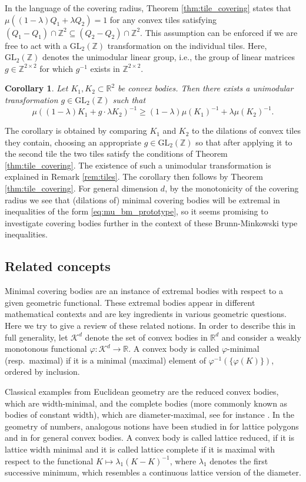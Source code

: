 \documentclass[11pt, a4paper]{amsart}
\newcommand{\RR}{\mathbb{R}}
\newcommand{\ZZ}{\mathbb{Z}}
\newcommand{\K}{\mathcal{K}}
\newcommand{\GL}{\mathrm{GL}}
\numberwithin{equation}{section}
\theoremstyle{plain}
\newtheorem{corollary}[theorem]{Corollary}
\begin{document}
In the language of the covering radius, Theorem \ref{thm:tile_covering} states that $\mu((1-\lambda)Q_1 + \lambda Q_2)=1$ for any convex tiles satisfying $(Q_1-Q_1)\cap\ZZ^2 \subseteq (Q_2-Q_2) \cap \ZZ^2$. This assumption can be enforced if we are free to act with a $\GL_2(\ZZ)$ transformation on the individual tiles. Here, $\GL_2(\ZZ)$ denotes the unimodular linear group, i.e., the group of linear matrices $g\in\ZZ^{2\times 2}$ for which $g^{-1}$ exists in $\ZZ^{2\times 2}$.

\begin{corollary}
\label{cor:isomorphic_mu_bm}
Let $K_1,K_2\subset\RR^2$ be convex bodies. Then there exists a unimodular transformation $g\in \GL_2(\ZZ)$ such that
\[
\mu((1-\lambda)K_1 + g\cdot\lambda K_2)^{-1} \geq (1-\lambda)\mu(K_1)^{-1} + \lambda\mu(K_2)^{-1}.
\]
\end{corollary}

The corollary is obtained by comparing $K_1$ and $K_2$ to the dilations of convex tiles they contain, choosing  an appropriate $g\in \GL_2(\ZZ)$ so that after applying it to the second tile the two tiles satisfy the conditions of Theorem \ref{thm:tile_covering}. The existence of such a unimodular transformation is explained in Remark \ref{rem:tiles}. The corollary then follows by Theorem \ref{thm:tile_covering}. For general dimension $d$, by the monotonicity of the covering radius we see that (dilations of) minimal covering bodies will be extremal in inequalities of the form \eqref{eq:mu_bm_prototype}, so it seems promising to investigate covering bodies further in the context of these Brunn-Minkowski type inequalities.


\subsection*{Related concepts}

Minimal covering bodies are an instance of extremal bodies with respect to a given geometric functional. These extremal bodies appear in different mathematical contexts and are key ingredients in various geometric questions. Here we try to give a review of these related notions.
In order to describe this in full generality, let $\K^d$ denote the set of convex bodies in $\RR^d$ and consider a weakly monotonous functional $\varphi\colon\K^d\to\RR$.
A convex body is called $\varphi$-minimal (resp.\ maximal) if it is a minimal (maximal) element of $\varphi^{-1} ( \{\varphi(K)\} )$, ordered by inclusion.

Classical examples from Euclidean geometry are the reduced convex bodies, which are width-minimal, and the complete bodies (more commonly known as bodies of constant width), which are diameter-maximal, see  for instance \cite{lassakmartini, martini}. In the geometry of numbers, analogous notions have been studied in \cite{barany, coolslemmens} for lattice polygons and in \cite{codenottifreyer} for general convex bodies. A convex body is called lattice reduced, if it is lattice width minimal and it is called lattice complete if it is maximal with respect to the functional $K\mapsto \lambda_1(K-K)^{-1}$, where $\lambda_1$ denotes the first successive minimum, which resembles a continuous lattice version of the diameter.
\end{document}
